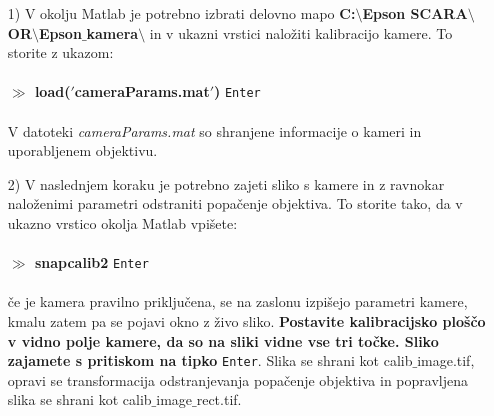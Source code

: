 \begin{enumerate}
\item[1)]  V okolju Matlab je potrebno izbrati delovno mapo
\textbf{C:$\setminus$Epson SCARA$\setminus$OR$\setminus$Epson$\_$kamera$\setminus$} in v  %
ukazni vrstici naložiti kalibracijo kamere. To storite z ukazom: \\ %
\vspace{-0.1cm}\\%
\textbf{$\gg$ load($\bm{'}$cameraParams.mat$\bm{'}$)} \verb"Enter" \\ %
\vspace{-0.2cm}\\%
V datoteki \textit{cameraParams.mat} so shranjene informacije o kameri in uporabljenem objektivu.
\vspace*{0.4cm} %

\item[2)] V naslednjem koraku je potrebno zajeti sliko s kamere in z ravnokar naloženimi %
parametri odstraniti popačenje objektiva. To storite tako, da v ukazno vrstico okolja %
Matlab vpišete: \\ %
\vspace{-0.3cm}\\%
\textbf{$\gg$ snapcalib2} \verb"Enter" \\ %
\vspace{-0.1cm}\\%
če je kamera pravilno priključena, se na zaslonu izpišejo parametri
kamere, kmalu zatem pa se pojavi okno z živo sliko.
\textbf{Postavite kalibracijsko ploščo v vidno polje kamere, da so na
sliki vidne vse tri točke. Sliko zajamete s pritiskom na tipko}
\verb"Enter". Slika se shrani kot calib$\_$image.tif, opravi se %
transformacija odstranjevanja popačenje objektiva in popravljena
slika se shrani kot calib$\_$image$\_$rect.tif.
\vspace*{0.2cm} %


\end{enumerate}
